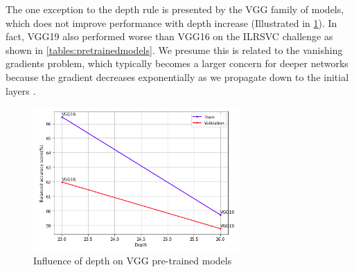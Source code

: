     The one exception to the depth rule is presented by the VGG family of models, which does not improve performance with depth increase (Illustrated in \ref{fig:vgg_depth}). In fact, VGG19 also performed worse than VGG16 on the ILRSVC challenge as shown in \ref{tables:pretrainedmodels}. We presume this is related to the vanishing gradients problem, which typically becomes a larger concern for deeper networks because the gradient decreases exponentially as we propagate down to the initial layers \cite{Nielsen2017a}. \par 
    \begin{figure}[ht]
        \centering
        \includegraphics[width=0.7\textwidth]{figs/vgg_depth.png}
        \caption{Influence of depth on VGG pre-trained models}
        \label{fig:vgg_depth}
    \end{figure}
    
